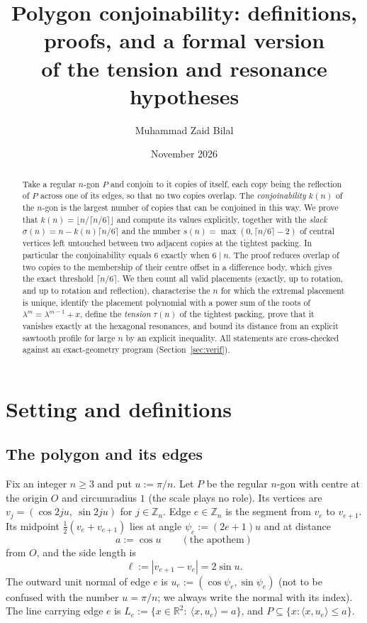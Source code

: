 \documentclass[11pt,a4paper]{article}
\title{Polygon conjoinability: definitions, proofs, and a formal version\\of the tension and resonance hypotheses}
\author{Muhammad Zaid Bilal}
\date{November 2026}
\theoremstyle{definition}
\theoremstyle{remark}
\newcommand{\Z}{\mathbb{Z}}
\newcommand{\R}{\mathbb{R}}
\newcommand{\ip}[2]{\langle #1,#2\rangle}
\begin{document}
\maketitle

\begin{abstract}
Take a regular $n$-gon $P$ and conjoin to it copies of itself, each copy being the reflection of $P$ across one of its edges, so that no two copies overlap.
The \emph{conjoinability} $k(n)$ of the $n$-gon is the largest number of copies that can be conjoined in this way.
We prove that $k(n)=\lfloor n/\lceil n/6\rceil\rfloor$ and compute its values explicitly, together with the \emph{slack} $\sigma(n)=n-k(n)\lceil n/6\rceil$ and the number
$s(n)=\max(0,\lceil n/6\rceil-2)$ of central vertices left untouched between two adjacent copies at the tightest packing. In particular the conjoinability equals $6$ exactly when $6\mid n$.
The proof reduces overlap of two copies to the membership of their centre offset in a difference body, which gives the exact threshold $\lceil n/6\rceil$.
We then count all valid placements (exactly, up to rotation, and up to rotation and reflection), characterise the $n$ for which the extremal placement is unique,
identify the placement polynomial with a power sum of the roots of $\lambda^m=\lambda^{m-1}+x$, define the \emph{tension} $\tau(n)$ of the tightest packing,
prove that it vanishes exactly at the hexagonal resonances, and bound its distance from an explicit sawtooth profile for large $n$ by an explicit inequality.
All statements are cross-checked against an exact-geometry program (Section~\ref{sec:verif}).
\end{abstract}

\tableofcontents

\section{Setting and definitions}\label{sec:setting}

\subsection{The polygon and its edges}
Fix an integer $n\ge3$ and put $u:=\pi/n$. Let $P$ be the regular $n$-gon with centre at the origin $O$ and circumradius $1$ (the scale plays no role).
Its vertices are $v_j=(\cos 2ju,\ \sin 2ju)$ for $j\in\Z_n$. Edge $e\in\Z_n$ is the segment from $v_e$ to $v_{e+1}$. Its midpoint $\tfrac12(v_e+v_{e+1})$ lies at angle $\psi_e:=(2e+1)u$ and at distance
\[
a:=\cos u\qquad(\text{the apothem})
\]
from $O$, and the side length is
\[
\ell:=|v_{e+1}-v_e|=2\sin u .
\]
The outward unit normal of edge $e$ is $u_e:=(\cos\psi_e,\sin\psi_e)$ (not to be confused with the number $u=\pi/n$; we always write the normal with its index). The line carrying edge $e$ is
$L_e:=\{x\in\R^2:\ \ip{x}{u_e}=a\}$, and $P\subseteq\{x:\ip{x}{u_e}\le a\}$.
\end{document}
